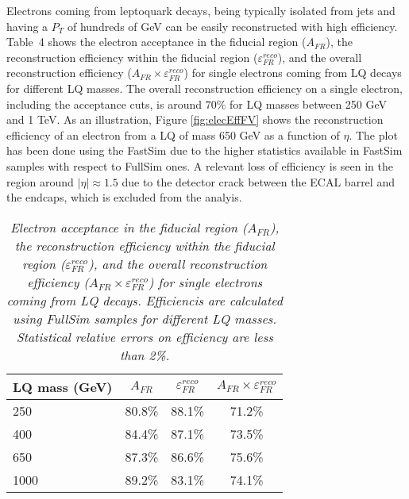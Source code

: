 Electrons coming from leptoquark decays, 
being typically isolated from jets and having a $P_{T}$ of hundreds of GeV can be easily reconstructed with high efficiency. 
Table~4
shows the electron acceptance in the fiducial region ($A_{FR}$), the 
reconstruction efficiency within the fiducial region ($\varepsilon_{FR}^{reco}$), and the overall reconstruction efficiency 
($A_{FR} \times \varepsilon_{FR}^{reco}$) for single electrons coming from LQ decays for different LQ masses.
The overall reconstruction efficiency on a single electron, including the acceptance cuts, is around $70\%$ for LQ masses between 250 GeV and 1 TeV.
As an illustration, Figure \ref{fig:elecEffFV} shows the reconstruction efficiency of an electron
from a LQ of mass 650 GeV as a function of $\eta$. The plot has been done using the FastSim 
due to the higher statistics available in FastSim samples with respect to FullSim ones. 
A relevant loss of efficiency is seen in the region around $|\eta| \approx 1.5$ due to the detector crack between the ECAL barrel and the endcaps, 
which is excluded from the analyis. %

\begin{table}[htb]
  \label{tab:ElecEffAcc}
  \begin{center}
    \begin{tabular}{|l|c|c|c|} \hline
      LQ mass (GeV) & $A_{FR}$ & $\varepsilon_{FR}^{reco}$ & $A_{FR} \times \varepsilon_{FR}^{reco}$\\ \hline
      250 & 80.8\% & 88.1\% & 71.2\% \\ \hline
      400 & 84.4\% & 87.1\% & 73.5\% \\ \hline
      650 & 87.3\% & 86.6\% & 75.6\% \\ \hline
      1000 & 89.2\% & 83.1\% & 74.1\% \\ \hline
    \end{tabular}
    \caption{\small \sl Electron acceptance in the fiducial region ($A_{FR}$), the 
      reconstruction efficiency within the fiducial region ($\varepsilon_{FR}^{reco}$), and the overall reconstruction efficiency 
      ($A_{FR} \times \varepsilon_{FR}^{reco}$) for single electrons coming from LQ decays. Efficiencis are 
      calculated using FullSim samples for different LQ masses. Statistical relative errors on efficiency are less than 2\%.}
  \end{center}
\end{table}

